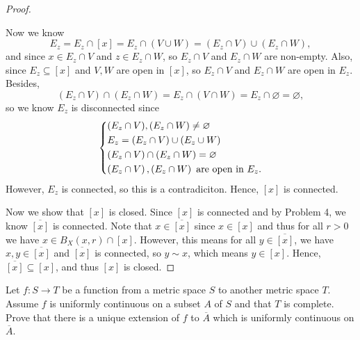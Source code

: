\begin{proof}
\begin{explanation}
    \end{explanation}    
    Now we know 
    \[
        E_z = E_z \cap [x] = E_z \cap (V \cup W) = (E_z \cap V) \cup (E_z \cap W),
    \] and since \(x \in E_z \cap V\) and \(z \in E_z \cap W\), so \(E_z \cap V\) and \(E_z \cap W\) are non-empty. Also, since \(E_z \subseteq [x]\) and \(V, W\) are open in \([x]\), so \(E_z \cap V\) and \(E_z \cap W\) are open in \(E_z\). Besides, 
    \[
        (E_z \cap V) \cap (E_z \cap W) = E_z \cap (V \cap W) = E_z \cap \varnothing = \varnothing,
    \] so we know \(E_z\) is disconnected since 
    \[
        \begin{dcases}
            (E_z \cap V), (E_z \cap W) \neq \varnothing \\
            E_z = (E_z \cap V ) \cup (E_z \cup W) \\
            (E_z \cap V) \cap (E_z \cap W) = \varnothing \\
            \left( E_z \cap V \right), \left( E_z \cap W \right) \text{ are open in } E_z.  
        \end{dcases}
    \] 
    However, \(E_z\) is connected, so this is a contradiciton. Hence, \([x]\) is connected. 
    
    Now we show that \([x]\) is closed. Since \([x]\) is connected and by Problem 4, we know \(\overline{[x]} \) is connected. Note that \(x \in \overline{[x]} \) since \(x \in [x]\) and thus for all \(r > 0\) we have \(x \in B_X(x, r) \cap [x]\). However, this means for all \(y \in \overline{[x]} \), we have \(x, y \in \overline{[x]} \) and \(\overline{[x]} \) is connected, so \(y \sim x\), which means \(y \in [x]\). Hence, \(\overline{[x]} \subseteq [x]\), and thus \([x]\) is closed.             
\end{proof}
\begin{problem}[15pts]
    Let $f : S \to T$ be a function from a metric space $S$ to another metric space $T$.  
Assume $f$ is uniformly continuous on a subset $A$ of $S$ and that $T$ is complete.  
Prove that there is a unique extension of $f$ to $\overline{A}$ which is uniformly continuous on $\overline{A}$.
\end{problem}